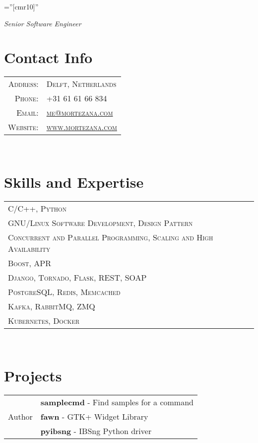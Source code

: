 \documentclass[a4paper,11pt]{article}
\begin{document}
\pagestyle{empty}    %
\font\fb=''[cmr10]'' %

\par {\bigskip \emph{Senior Software Engineer} \par}

\section{Contact Info}
\begin{tabular}{rl}

    \textsc{Address:}     & \textsc{Delft, Netherlands}\\
    \textsc{Phone:}       & \textsc{+31 61 61 66 834}\\
    \textsc{Email:}       & \textsc{\href{mailto:me@mortezana.com}{me@mortezana.com}}\\
    \textsc{Website:}     & \textsc{\href{https://mortezana.com}{www.mortezana.com}}\\

\end{tabular}\\

\section{Skills and Expertise}
\begin{tabular}{lr}

    \textsc{C/C++, Python}\\
    \textsc{GNU/Linux Software Development, Design Pattern}\\
    \textsc{Concurrent and Parallel Programming, Scaling and High Availability}\\
    \textsc{Boost, APR}\\
    \textsc{Django, Tornado, Flask, REST, SOAP}\\
    \textsc{PostgreSQL, Redis, Memcached}\\
    \textsc{Kafka, RabbitMQ, ZMQ}\\
    \textsc{Kubernetes, Docker}\\

\end{tabular}\\

\section{Projects}
\begin{tabular}{r|p{11cm}}

    \multirow{3}{*}{\hspace{2.75cm}Author}
    & \textbf{samplecmd} - Find samples for a command\\
    & \textbf{fawn} - GTK+ Widget Library\\
    & \textbf{pyibsng} - IBSng Python driver\\

\end{tabular}\\
\end{document}
